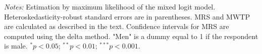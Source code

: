 \begin{table}[!htbp]
\begin{center}
\begin{scriptsize}
\begin{threeparttable}
\begin{tablenotes}
\scriptsize
\item \textit{Notes:} Estimation by maximum likelihood of the mixed logit model. Heteroskedasticity-robust standard errors are in parentheses. MRS and MWTP are calculated as described in the text. Confidence intervals for MRS are computed using the delta method. "Men" is a dummy equal to 1 if the respondent is male. $^{*}p < 0.05$; $^{**}p < 0.01$; $^{***}p < 0.001$.
\end{tablenotes}

\end{threeparttable}
\end{scriptsize}
\label{table:interaction_sex}
\end{center}
\end{table}
